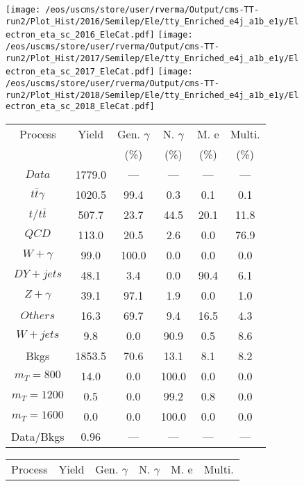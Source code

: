 \begin{figure}
\centering
\texttt{[image: /eos/uscms/store/user/rverma/Output/cms-TT-run2/Plot\_Hist/2016/Semilep/Ele/tty\_Enriched\_e4j\_a1b\_e1y/Electron\_eta\_sc\_2016\_EleCat.pdf]}
\texttt{[image: /eos/uscms/store/user/rverma/Output/cms-TT-run2/Plot\_Hist/2017/Semilep/Ele/tty\_Enriched\_e4j\_a1b\_e1y/Electron\_eta\_sc\_2017\_EleCat.pdf]}
\texttt{[image: /eos/uscms/store/user/rverma/Output/cms-TT-run2/Plot\_Hist/2018/Semilep/Ele/tty\_Enriched\_e4j\_a1b\_e1y/Electron\_eta\_sc\_2018\_EleCat.pdf]}
\begin{minipage}[c]{0.32\textwidth}
\centering
\tiny{
\begin{tabular}{cccccc}
\hline
Process & Yield & Gen. $\gamma$ & N. $\gamma$ & M. e & Multi. \\
 &  & (\%) & (\%) & (\%) & (\%)  \\
\hline
                                                                      $ Data $ &  1779.0 &  --- &  --- &  --- &  ---\\
$ t\bar{t}\gamma $ &  1020.5 &  99.4 &  0.3 &  0.1 &  0.1\\
$ t/t\bar{t} $ &  507.7 &  23.7 &  44.5 &  20.1 &  11.8\\
$ QCD $ &  113.0 &  20.5 &  2.6 &  0.0 &  76.9\\
$ W+\gamma $ &  99.0 &  100.0 &  0.0 &  0.0 &  0.0\\
$ DY+jets $ &  48.1 &  3.4 &  0.0 &  90.4 &  6.1\\
$ Z+\gamma $ &  39.1 &  97.1 &  1.9 &  0.0 &  1.0\\
$ Others $ &  16.3 &  69.7 &  9.4 &  16.5 &  4.3\\
$ W+jets $ &  9.8 &  0.0 &  90.9 &  0.5 &  8.6\\
Bkgs &  1853.5 &  70.6 &  13.1 &  8.1 &  8.2\\
$ m_{T} = 800 $ &  14.0 &  0.0 &  100.0 &  0.0 &  0.0\\
$ m_{T} = 1200 $ &  0.5 &  0.0 &  99.2 &  0.8 &  0.0\\
$ m_{T} = 1600 $ &  0.0 &  0.0 &  100.0 &  0.0 &  0.0\\
Data/Bkgs &  0.96 &  --- &  --- &  --- &  ---\\
\hline
\end{tabular}
}
\end{minipage}
\begin{minipage}[c]{0.32\textwidth}
\centering
\tiny{
\begin{tabular}{cccccc}
\hline
Process & Yield & Gen. $\gamma$ & N. $\gamma$ & M. e & Multi. \\

\end{tabular}}
\end{minipage}
\end{figure}
